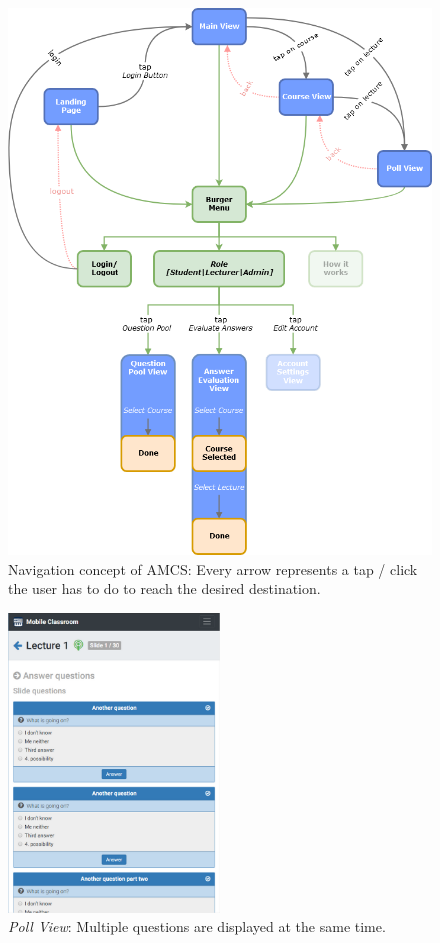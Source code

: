 \begin{figure}[ht]
	\centering
	\includegraphics[width=\textwidth]{diagrams/amcs-click-paths.png}
	\caption{Navigation concept of AMCS: Every arrow represents a tap / click the user has to do to reach the desired destination.}
	\label{figure:clickpathproblems}
\end{figure}

\begin{figure}[ht]
	\centering
	\includegraphics[width=0.5\textwidth]{screenshots/poll_view_2.png}
	\caption{\emph{Poll View}: Multiple questions are displayed at the same time.}
	\label{figure:pollview}
\end{figure}
